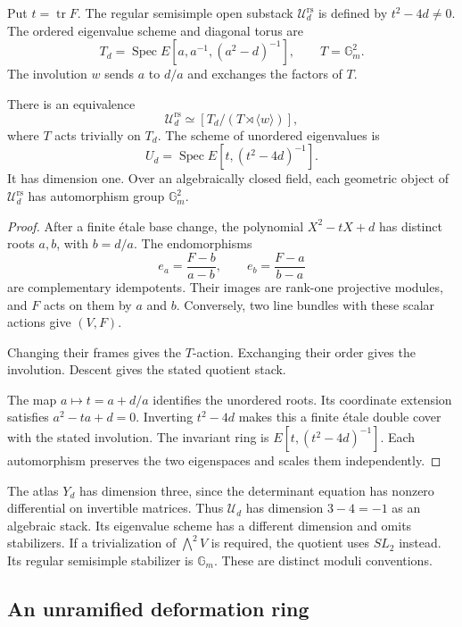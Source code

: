 Put $t=\operatorname{tr}F$. The regular semisimple open substack
$\mathcal U_d^{\mathrm{rs}}$ is defined by $t^2-4d\ne0$.
The ordered eigenvalue scheme and diagonal torus are
\[
 T_d=\operatorname{Spec}E[a,a^{-1},(a^2-d)^{-1}],\qquad
 T=\mathbb G_m^2.
\]
The involution $w$ sends $a$ to $d/a$ and exchanges the factors of $T$.

\begin{proposition}
\label{v4-arith:ic:w5-e:local:frobenius-stack}
There is an equivalence
\[
 \mathcal U_d^{\mathrm{rs}}\simeq[T_d/(T\rtimes\langle w\rangle)],
\]
where $T$ acts trivially on $T_d$. The scheme of unordered eigenvalues is
\[
 U_d=\operatorname{Spec}E[t,(t^2-4d)^{-1}].
\]
It has dimension one. Over an algebraically closed field, each
geometric object of $\mathcal U_d^{\mathrm{rs}}$ has automorphism group
$\mathbb G_m^2$.
\end{proposition}

\begin{proof}
After a finite \textrm{\'etale} base change, the polynomial
$X^2-tX+d$ has distinct roots $a,b$, with $b=d/a$.
The endomorphisms
\[
 e_a=\frac{F-b}{a-b},\qquad e_b=\frac{F-a}{b-a}
\]
are complementary idempotents. Their images are rank-one projective
modules, and $F$ acts on them by $a$ and $b$.
Conversely, two line bundles with these scalar actions give $(V,F)$.

Changing their frames gives the $T$-action. Exchanging their order
gives the involution. Descent gives the stated quotient stack.

The map $a\mapsto t=a+d/a$ identifies the unordered roots.
Its coordinate extension satisfies $a^2-ta+d=0$.
Inverting $t^2-4d$ makes this a finite \textrm{\'etale} double cover
with the stated involution. The invariant ring is
$E[t,(t^2-4d)^{-1}]$. Each automorphism preserves the two eigenspaces
and scales them independently.
\end{proof}

The atlas $Y_d$ has dimension three, since the determinant equation
has nonzero differential on invertible matrices.
Thus $\mathcal U_d$ has dimension $3-4=-1$ as an algebraic stack.
Its eigenvalue scheme has a different dimension and omits stabilizers.
If a trivialization of $\bigwedge^2V$ is required, the quotient uses
$SL_2$ instead. Its regular semisimple stabilizer is $\mathbb G_m$.
These are distinct moduli conventions.

\subsection{An unramified deformation ring}

